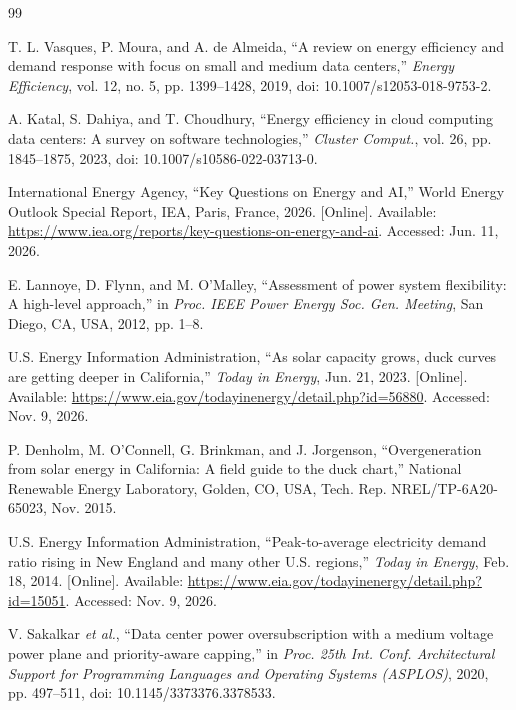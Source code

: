 \documentclass{UNCC-thesis}
\begin{document}
\fbmatterchapterformat

\begin{thebibliography}{99}

T. L. Vasques, P. Moura, and A. de Almeida, ``A review on energy efficiency
and demand response with focus on small and medium data centers,''
\emph{Energy Efficiency}, vol. 12, no. 5, pp. 1399--1428, 2019,
doi: 10.1007/s12053-018-9753-2.

A. Katal, S. Dahiya, and T. Choudhury, ``Energy efficiency in cloud computing
data centers: A survey on software technologies,'' \emph{Cluster Comput.},
vol. 26, pp. 1845--1875, 2023, doi: 10.1007/s10586-022-03713-0.

International Energy Agency, ``Key Questions on Energy and AI,'' World Energy
Outlook Special Report, IEA, Paris, France, 2026. [Online]. Available:
\url{https://www.iea.org/reports/key-questions-on-energy-and-ai}.
Accessed: Jun. 11, 2026.

E. Lannoye, D. Flynn, and M. O'Malley, ``Assessment of power system flexibility: A high-level
approach,'' in \emph{Proc. IEEE Power Energy Soc. Gen. Meeting}, San Diego, CA, USA, 2012,
pp. 1--8.

U.S. Energy Information Administration, ``As solar capacity grows, duck curves are getting deeper
in California,'' \emph{Today in Energy}, Jun. 21, 2023. [Online]. Available:
\url{https://www.eia.gov/todayinenergy/detail.php?id=56880}. Accessed: Nov. 9, 2026.

P. Denholm, M. O'Connell, G. Brinkman, and J. Jorgenson, ``Overgeneration from solar energy in
California: A field guide to the duck chart,'' National Renewable Energy Laboratory, Golden, CO,
USA, Tech. Rep. NREL/TP-6A20-65023, Nov. 2015.

U.S. Energy Information Administration, ``Peak-to-average electricity demand ratio rising in New
England and many other U.S. regions,'' \emph{Today in Energy}, Feb. 18, 2014. [Online].
Available: \url{https://www.eia.gov/todayinenergy/detail.php?id=15051}. Accessed: Nov. 9, 2026.

V. Sakalkar \emph{et al.}, ``Data
center power oversubscription with a medium voltage power plane and
priority-aware capping,'' in \emph{Proc. 25th Int. Conf. Architectural
Support for Programming Languages and Operating Systems (ASPLOS)}, 2020,
pp. 497--511, doi: 10.1145/3373376.3378533.


\end{thebibliography}
\end{document}
